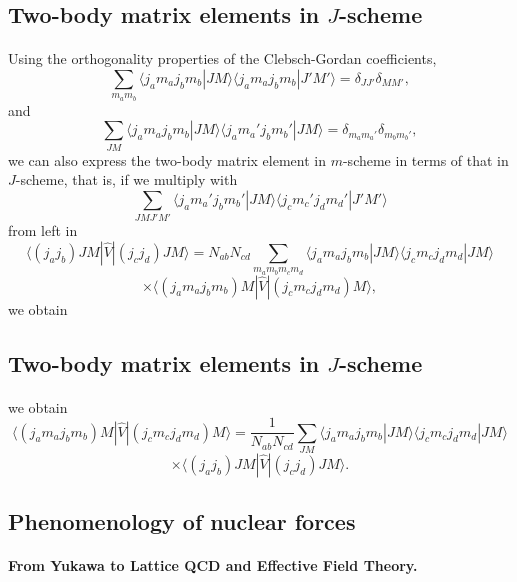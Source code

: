 \documentclass[%
twoside,                 %
final,                   %
10pt]{article}
\begin{document}
\subsection*{Two-body matrix elements in $J$-scheme}

\paragraph{}
Using the orthogonality properties of the Clebsch-Gordan coefficients,
\[
\sum_{m_am_b}\langle j_am_aj_bm_b|JM\rangle\langle j_am_aj_bm_b|J'M'\rangle=\delta_{JJ'}\delta_{MM'},
\]
and
\[
\sum_{JM}\langle j_am_aj_bm_b|JM\rangle\langle j_am_a'j_bm_b'|JM\rangle=\delta_{m_am_a'}\delta_{m_bm_b'},
\]
we can also express the two-body matrix element in $m$-scheme in terms of that in $J$-scheme, that is, if we multiply with 
\[
\sum_{JMJ'M'}\langle j_am_a'j_bm_b'|JM\rangle\langle j_cm_c'j_dm_d'|J'M'\rangle
\]
from left in
\[
\langle (j_a j_b) JM | \hat{V} | (j_c j_d) JM \rangle = N_{ab}N_{cd}\sum_{m_a m_b m_c m_d}\langle j_am_aj_bm_b|JM\rangle\langle j_cm_cj_dm_d|JM\rangle
\]
\[
\times \langle (j_am_aj_bm_b)M|  \hat{V} | (j_cm_cj_dm_d)M\rangle,
\]
we obtain



\subsection*{Two-body matrix elements in $J$-scheme}

\paragraph{}
we obtain
\[
\langle (j_am_aj_bm_b)M |  \hat{V} | (j_cm_cj_dm_d)M\rangle=\frac{1}{N_{ab}N_{cd}}\sum_{JM}\langle j_am_aj_bm_b|JM\rangle\langle j_cm_cj_dm_d|JM\rangle
\]
\[
\times \langle (j_aj_b) JM | \hat{V} | (j_cj_d) JM \rangle.
\]




\subsection*{Phenomenology of nuclear forces}

\paragraph{From Yukawa to Lattice QCD and Effective Field Theory.}
\end{document}
